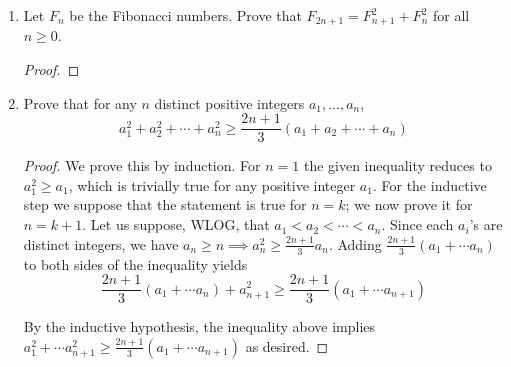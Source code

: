 \documentclass{article}
\begin{document}
\begin{enumerate}
\begin{proof}
We first note the following identity which holds for all integer $k$: $(k+3)^2 - (k+2)^2 - (k+1)^2 + k^2 = 4$. Thus, if we have $n = \pm 1^2 \pm 2^2 \pm 3^2 \pm \cdots \pm K^2$, we can find a corresponding expression for $n+4$ by considering $n+4 = \pm 1^2 \pm 2^2 \pm 3^2 \pm \cdots \pm K^2 + k^2 - (k+2)^2 - (k+1)^2 + (k+3)^2$. Thus, if we can show that this statement holds for $n = 1, 2, 3, 4$ then we are done. This is completed with the following expressions
\begin{align}
    1 &= 1^2\\
    2 &= -1^2 - 2^2 - 3^2 + 4^2\\
    3 &= -1^2 + 2^2\\
    4 &= 1^2 - 2^2 - 3^2 + 4^2
\end{align}
\end{proof}

\item  Let $F_n$ be the Fibonacci numbers. Prove that $F_{2n+1} = F_{n+1}^2+ F_n^2$ for all $n \geq 0$. 
\begin{proof}

\end{proof}

\item Prove that for any $n$ distinct positive integers $a_1,..., a_n$,
\begin{equation}
    a_1^2 + a_2^2 + \cdots + a_n^2 \geq \frac{2n+1}{3}(a_1 + a_2 + \cdots + a_n)
\end{equation}

\begin{proof}
We prove this by induction. For $n=1$ the given inequality reduces to $a_1^2 \geq a_1$, which is trivially true for any positive integer $a_1$. For the inductive step we suppose that the statement is true for $n=k$; we now prove it for $n=k+1$. Let us suppose, WLOG, that $a_1 < a_2< \cdots < a_n$. Since each $a_i$'s are distinct integers, we have $a_n \geq n \implies a_n^2 \geq \frac{2n+1}{3}a_n$. Adding $\frac{2n+1}{3}(a_1 + \cdots a_n)$ to both sides of the inequality yields
\begin{equation}
   \frac{2n+1}{3}(a_1 + \cdots a_{n}) + a_{n+1}^2  \geq  \frac{2n+1}{3}(a_1 + \cdots a_{n+1})
\end{equation}

By the inductive hypothesis, the inequality above implies $a_1^2 + \cdots a_{n+1}^2 \geq \frac{2n+1}{3}(a_1 + \cdots a_{n+1})$ as desired. 
\end{proof}


\end{enumerate}
\end{document}
